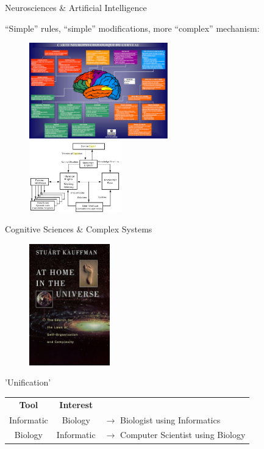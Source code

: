 \documentclass[8pt, handout=show,notes=show]{beamer}
\begin{document}
\begin{frame}{Neurosciences \& Artificial Intelligence}

    ``Simple'' rules, ``simple'' modifications, more ``complex'' mechanism:\\
    \begin{figure}
	\includegraphics[width=6cm]{images/cogscience.jpg}\\
	\includegraphics[width=4cm]{images/ai.jpg}
    \end{figure}
    
\end{frame}

\begin{frame}{Cognitive Sciences \& Complex Systems}
    \begin{figure}
	\includegraphics[width=3.5cm]{images/kauffman.jpg}
    \end{figure}

    \begin{alertblock}	{'Unification'} 
	\begin{table}
	    \centering
	    \begin{tabular}{c|cl}
		\textbf{Tool} & \textbf{Interest}  \\\cline{1-2}
		Informatic & Biology &  $\rightarrow$ Biologist using Informatics  \\
		Biology & Informatic& $\rightarrow$ Computer Scientist using Biology\\
	    \end{tabular}
	\end{table}
    \end{alertblock}
\end{frame}
\end{document}
